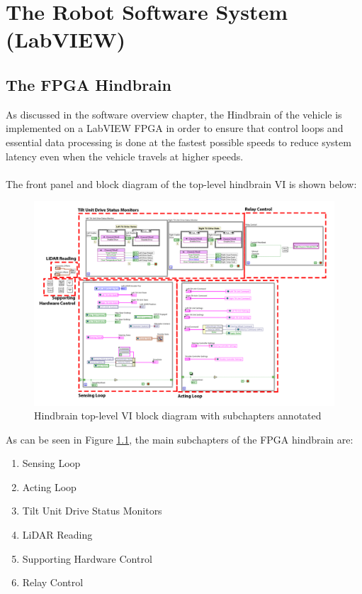 \chapter{The Robot Software System (LabVIEW)}

\section{The FPGA Hindbrain}
As discussed in the software overview chapter, the Hindbrain of the vehicle is implemented on a LabVIEW FPGA in order to ensure that control loops and essential data processing is done at the fastest possible speeds to reduce system latency even when the vehicle travels at higher speeds. \\ \\
%
The front panel and block diagram of the top-level hindbrain VI is shown below:

\begin{figure}[h!]
\centering
\includegraphics[scale=0.55]{Photos/hindbrainblock_annotated.png}
\caption{Hindbrain top-level VI block diagram with subchapters annotated}
\label{fig:hindbrainblock}
\end{figure} 

\newpage

\noindent As can be seen in Figure \ref{fig:hindbrainblock}, the main subchapters of the FPGA hindbrain are:

\begin{enumerate}
\item Sensing Loop
\item Acting Loop
\item Tilt Unit Drive Status Monitors
\item LiDAR Reading
\item Supporting Hardware Control
\item Relay Control
\end{enumerate}

